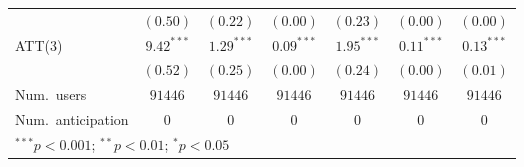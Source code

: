 \begin{table}[htbp]
\begin{tabular}{l c c c c c c}
                   & $(0.50)$      & $(0.22)$     & $(0.00)$     & $(0.23)$     & $(0.00)$     & $(0.00)$     \\
ATT(3)             & $9.42^{***}$  & $1.29^{***}$ & $0.09^{***}$ & $1.95^{***}$ & $0.11^{***}$ & $0.13^{***}$ \\
                   & $(0.52)$      & $(0.25)$     & $(0.00)$     & $(0.24)$     & $(0.00)$     & $(0.01)$     \\
\hline
Num.\ users         & $91446$    & $91446$   & $91446$   & $91446$   & $91446$   & $91446$   \\
Num.\ anticipation & $0$        & $0$       & $0$       & $0$       & $0$       & $0$       \\
\hline
\multicolumn{7}{l}{\scriptsize{$^{***}p<0.001$; $^{**}p<0.01$; $^{*}p<0.05$}}
\end{tabular}

\label{tab:res_callaway2021_mobility_features}%
\end{table}%

